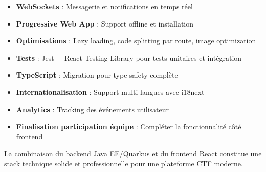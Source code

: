 \begin{itemize}
    \item \textbf{WebSockets} : Messagerie et notifications en temps réel
    \item \textbf{Progressive Web App} : Support offline et installation
    \item \textbf{Optimisations} : Lazy loading, code splitting par route, image optimization
    \item \textbf{Tests} : Jest + React Testing Library pour tests unitaires et intégration
    \item \textbf{TypeScript} : Migration pour type safety complète
    \item \textbf{Internationalisation} : Support multi-langues avec i18next
    \item \textbf{Analytics} : Tracking des événements utilisateur
    \item \textbf{Finalisation participation équipe} : Compléter la fonctionnalité côté frontend
\end{itemize}

La combinaison du backend Java EE/Quarkus et du frontend React constitue une stack technique solide et professionnelle pour une plateforme CTF moderne.
